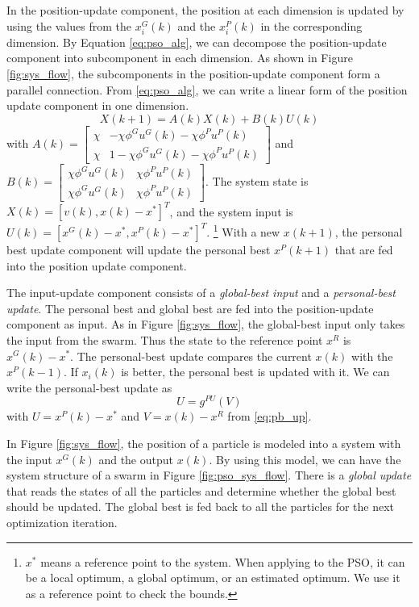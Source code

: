 In the position-update component, the position at each dimension is updated by using the values from the $ x^{G}_{i}(k) $ and the $ x^{P}_{i}(k) $ in the corresponding dimension.
By Equation \eqref{eq:pso_alg}, we can decompose the position-update component into subcomponent in each dimension.
As shown in Figure \ref{fig:sys_flow}, the subcomponents in the position-update component form a parallel connection.
From \eqref{eq:pso_alg}, we can write a linear form of the position update component in one dimension.
\begin{equation}
\label{eq:pso_up_linalg_simp}
X(k+1) = A(k) X(k) + B(k) U(k)
\end{equation}
with
$ A(k) = \begin{bmatrix}
\chi & - \chi \phi^{G} u^{G}(k) - \chi \phi^{P} u^{P}(k)
\\ 
\chi & 1 - \chi \phi^{G} u^{G}(k) - \chi \phi^{P} u^{P}(k)
\end{bmatrix} $
and
$ B(k) = \begin{bmatrix}
\chi \phi^{G} u^{G}(k) & \chi \phi^{P} u^{P}(k)
\\ 
\chi \phi^{G} u^{G}(k) & \chi \phi^{P} u^{P}(k)
\end{bmatrix} $.
The system state is $ X(k) = [ v(k), x(k) - x^{*} ]^{T} $, and the system input is $ U(k) = [ x^{G}(k) - x^{*} , x^{P}(k) - x^{*} ]^{T} $.
\footnote{$ x^{*} $ means a reference point to the system.
When applying to the PSO, it can be a local optimum, a global optimum, or an estimated optimum.
We use it as a reference point to check the bounds.}
With a new $ x(k+1) $, the personal best update component will update the personal best $ x^{P}(k+1) $ that are fed into the position update component.

The input-update component consists of a \emph{global-best input} and a \emph{personal-best update}.
The personal best and global best are fed into the position-update component as input.
As in Figure \ref{fig:sys_flow}, the global-best input only takes the input from the swarm.
Thus the state to the reference point $ x^{R} $ is $  x^{G}(k) - x^{*} $.
The personal-best update compares the current $ x(k) $ with the $ x^{P}(k-1) $.
If  $ x_{i}(k) $ is better, the personal best is updated with it.
We can write the personal-best update as 
\begin{equation}
\label{eq:pso_input_up}
U = g^{PU}(V)
\end{equation}
with $ U = x^{P}(k) - x^{*} $ 
and $ V = x(k) - x^{R} $
from \eqref{eq:pb_up}. 

In Figure \ref{fig:sys_flow}, the position of a particle is modeled into a system with the input $ x^{G}(k) $ and the output $ x(k) $.
By using this model, we can have the system structure of a swarm in Figure \ref{fig:pso_sys_flow}.
There is a \emph{global update} that reads the states of all the particles and determine whether the global best should be updated.
The global best is fed back to all the particles for the next optimization iteration.


